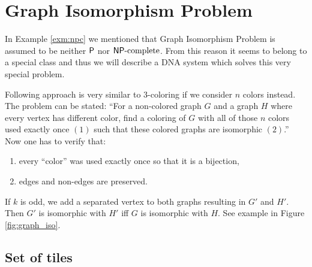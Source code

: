 \section{Graph Isomorphism Problem}

In Example \ref{exm:npc} we mentioned that Graph Isomorphism Problem is assumed to be neither $\P$ nor $\NPC$. From this reason it seems to belong to a special class and thus we will describe a DNA system which solves this very special problem. %

Following approach is very similar to 3-coloring if we consider $n$ colors instead. The problem can be stated: ``For a non-colored graph $G$ and a graph $H$ where every vertex has different color, find a coloring of $G$ with all of those $n$ colors used exactly once $(1)$ such that these colored graphs are isomorphic $(2)$.'' Now one has to verify that:
\begin{enumerate}
	\item every ``color'' was used exactly once so that it is a bijection,
	\item edges and non-edges are preserved.
\end{enumerate}

If $k$ is odd, we add a separated vertex to both graphs resulting in $G'$ and $H'$. Then $G'$ is isomorphic with $H'$ iff $G$ is isomorphic with $H$. See example in Figure \ref{fig:graph_iso}.

\subsection*{Set of tiles}

